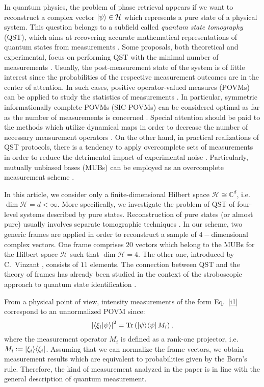 \documentclass[aps,pra,reprint,groupedaddress,showkeys]{revtex4-1}
\renewcommand{\eqref}[1]{Eq.~\ref{#1}}
\newcommand{\tr}{{\mathrm{Tr}}}
\begin{document}
In quantum physics, the problem of phase retrieval appears if we want to reconstruct a complex vector $\ket{\psi} \in \mathcal{H}$ which represents a pure state of a physical system. This question belongs to a subfield called \textit{quantum state tomography} (QST), which aims at recovering accurate mathematical representations of quantum states from measurements \cite{dariano03,paris04}. Some proposals, both theoretical and experimental, focus on performing QST with the minimal number of measurements \cite{Oren2017,Martinez2019}. Usually, the post-measurement state of the system is of little interest since the probabilities of the respective measurement outcomes are in the center of attention. In such cases, positive operator-valued measures (POVMs) can be applied to study the statistics of measurements \cite{Nielsen2000}. In particular, symmetric informationally complete POVMs (SIC-POVMs) can be considered optimal as far as the number of measurements is concerned \cite{Rehacek2004,Renes2004,Fuchs2017}. Special attention should be paid to the methods which utilize dynamical maps in order to decrease the number of necessary measurement operators \cite{Czerwinski2016a,Czerwinski2020a}. On the other hand, in practical realizations of QST protocols, there is a tendency to apply overcomplete sets of measurements in order to reduce the detrimental impact of experimental noise \cite{Horn2013,Zhu2014}. Particularly, mutually unbiased bases (MUBs) can be employed as an overcomplete measurement scheme \cite{Wootters1989,Durt2010}.

In this article, we consider only a finite-dimensional Hilbert space $\mathcal{H} \cong \mathbb{C}^d$, i.e. $\dim \mathcal{H} = d < \infty$. More specifically, we investigate the problem of QST of four-level systems described by pure states. Reconstruction of pure states (or almost pure) usually involves separate tomographic techniques \cite{Gross2010,Bantysh2020,Zambrano2020}. In our scheme, two generic frames are applied in order to reconstruct a sample of $4-$dimensional complex vectors. One frame comprises $20$ vectors which belong to the MUBs for the Hilbert space $\mathcal{H}$ such that $\dim \mathcal{H} = 4$. The other one, introduced by C.~Vinzant \cite{vinzant15}, consists of $11$ elements. The connection between QST and the theory of frames has already been studied in the context of the stroboscopic approach to quantum state identification \cite{Jamiolkowski2010,Jamiolkowski2012}.

From a physical point of view, intensity measurements of the form \eqref{i1} correspond to an unnormalized POVM since:
\begin{equation}\label{i2}
\left|\braket{\xi_i | \psi }\right|^2 = \tr \left( \ket{\psi} \! \bra{\psi} M_i \right),
\end{equation}
where the measurement operator $M_i$ is defined as a rank-one projector, i.e. $M_i := \ket{\xi_i} \! \bra{\xi_i}$. Assuming that we can normalize the frame vectors, we obtain measurement results which are equivalent to probabilities given by the Born's rule. Therefore, the kind of measurement analyzed in the paper is in line with the general description of quantum measurement.
\end{document}
